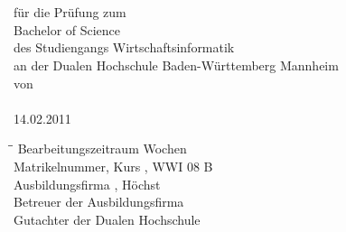 \thispagestyle{plain}
\begin{titlepage}

\begin{center}


\huge{\textsc{\textbf{\titel}}}\\[4.5ex]
\large{\textbf{\art}}\\[1ex]
\large{für die Prüfung zum}\\[1ex]
\large{Bachelor of Science}\\[5ex]
\large{des Studiengangs Wirtschaftsinformatik}\\[1ex]
\large{an der Dualen Hochschule Baden-Württemberg Mannheim}\\[5ex]

von\\[1ex]
\autor\\[4ex]


14.02.2011\\[5ex]

\normalsize
\begin{tabbing}
\hspace*{8cm}\=\hspace{8cm}\=\kill
Bearbeitungszeitraum  Wochen\\
Matrikelnummer, Kurs \>\matrikelnr, WWI 08 B\\
Ausbildungsfirma \>\firmenname, Höchst\\
Betreuer der Ausbildungsfirma \>\zweitgutachter\\
Gutachter der Dualen Hochschule \>\erstgutachter\\
\end{tabbing}
\end{center}
\end{titlepage}
